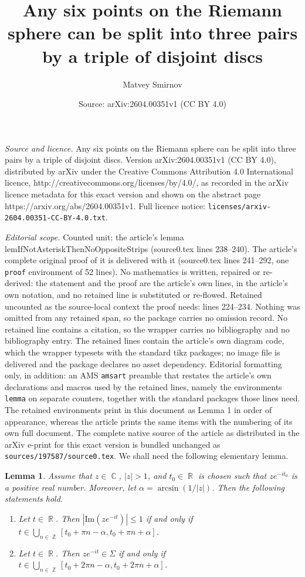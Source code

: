 \documentclass[10pt,a4paper]{amsart}
\title{Any six points on the Riemann sphere can be split into three pairs by a triple of disjoint discs}
\author{Matvey Smirnov}
\date{Source: arXiv:2604.00351v1 (CC BY 4.0)}
\newtheorem{lemma}{Lemma}
\DeclareMathOperator{\CC}{\mathbb C}
\DeclareMathOperator{\RR}{\mathbb R}
\DeclareMathOperator{\ZZ}{\mathbb Z}
\begin{document}
\maketitle

\noindent\emph{Source and licence.} Any six points on the Riemann sphere can be split into three pairs by a triple of disjoint discs. Version arXiv:2604.00351v1 (CC BY 4.0), distributed by arXiv under the Creative Commons Attribution 4.0 International licence, http://creativecommons.org/licenses/by/4.0/, as recorded in the arXiv licence metadata for this exact version and shown on the abstract page https://arxiv.org/abs/2604.00351v1. Full licence notice: \texttt{licenses/arxiv-2604.00351-CC-BY-4.0.txt}.\par\smallskip

\noindent\textit{Editorial scope.} Counted unit: the article's lemma lemIfNotAsteriskThenNoOppositeStrips (source0.tex lines 238--240). The article's complete original proof of it is delivered with it (source0.tex lines 241--292, one \texttt{proof} environment of 52 lines). No mathematics is written, repaired or re-derived: the statement and the proof are the article's own lines, in the article's own notation, and no retained line is substituted or re-flowed.  Retained uncounted as the source-local context the proof needs: lines 224--234.  Nothing was omitted from any retained span, so the package carries no omission record.  No retained line contains a citation, so the wrapper carries no bibliography and no bibliography entry.  The retained lines contain the article's own diagram code, which the wrapper typesets with the standard tikz packages; no image file is delivered and the package declares no asset dependency.  Editorial formatting only, in addition: an AMS \texttt{amsart} preamble that restates the article's own declarations and macros used by the retained lines, namely the environments \texttt{lemma} on separate counters, together with the standard packages those lines need.  The retained environments print in this document as Lemma 1 in order of appearance, whereas the article prints the same items with the numbering of its own full document.  The complete native source of the article as distributed in the arXiv e-print for this exact version is bundled unchanged as \texttt{sources/197587/source0.tex}.
	We shall need the following elementary lemma.
	\begin{lemma}\label{lemArcsin}
		Assume that $z \in \CC$, $|z| > 1$, and $t_0 \in \RR$ is chosen such that $z e^{-it_0}$ is a positive real number. Moreover, let $\alpha = \arcsin(1/|z|)$. Then the following statements hold.
		\begin{enumerate}[label=(\roman*)]
			\item\label{arcsini} Let $t \in \RR$.  Then $|\mathrm{Im}(ze^{-it})| \le 1$ if and only if $t \in \bigcup\limits_{n \in \ZZ} [t_0 + \pi n - \alpha, t_0 + \pi n + \alpha]$.
			\item\label{arcsinii} Let $t \in \RR$.  Then $ze^{-it} \in \Sigma$ if and only if $t \in \bigcup\limits_{n \in \ZZ} [t_0 + 2\pi n - \alpha, t_0 + 2\pi n + \alpha]$.
		\end{enumerate}
	\end{lemma}
\end{document}
